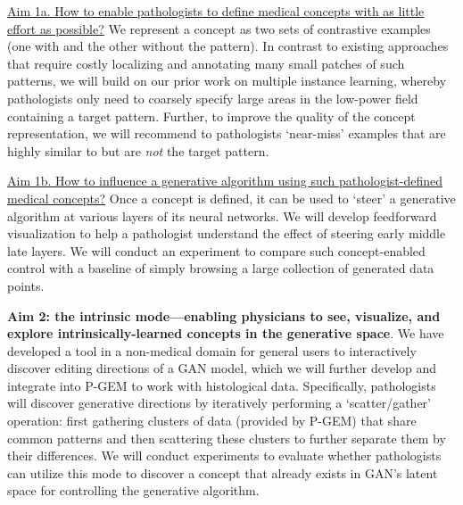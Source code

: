     \underline{Aim 1a. How to enable pathologists to define medical concepts with as little effort as possible?} 
    We represent a concept as two sets of contrastive examples (\eg one with and the other without the \xx pattern).
    In contrast to existing approaches that require costly localizing and annotating many small patches of such patterns, we will build on our prior work on multiple instance learning, whereby pathologists only need to coarsely specify large areas in the low-power field containing a target pattern. Further, to improve the quality of the concept representation, we will recommend to pathologists `near-miss' examples that are highly similar to but are {\it not} the target pattern.

    \underline{Aim 1b. How to influence a generative algorithm using such pathologist-defined medical concepts?}
    Once a concept is defined, it can be used to `steer' a generative algorithm at various layers of its neural networks. We will develop feedforward visualization to help a pathologist understand the effect of steering early \vs middle \vs late layers. 
    We will conduct an experiment to compare such concept-enabled control with a baseline of simply browsing a large collection of generated data points.


{\bf Aim 2: the intrinsic mode---enabling physicians to see, visualize, and explore intrinsically-learned concepts in the generative space}.
We have developed a tool in a non-medical domain for general users to interactively discover editing directions of a GAN model, which we will further develop and integrate into P-GEM to work with histological data.
Specifically, pathologists will discover generative directions by iteratively performing a `scatter/gather' operation: first gathering clusters of data (provided by P-GEM) that share common patterns and then scattering these clusters to further separate them by their differences.
We will conduct experiments to evaluate whether pathologists can utilize this mode to discover a concept that already exists in GAN's latent space for controlling the generative algorithm.




